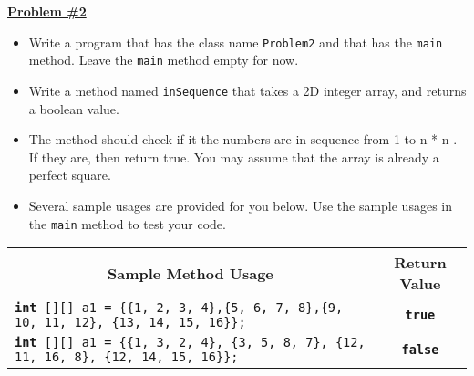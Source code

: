 \documentclass[12pt]{article}
\begin{document}
\vspace*{0.5cm}
\noindent\underline{\textbf{Problem \#2}}
\begin{itemize}
	\item Write a program that has the class name \texttt{Problem2} and that has the \texttt{main} method. Leave the \texttt{main} method empty for now.
	\item Write a method named \texttt{inSequence} that takes a 2D integer array, and returns a boolean value. 
	\item The method should check if it the numbers are in sequence from  1 to n * n . If they are, then return true. You may assume that the array is already a perfect square.
	\item Several sample usages are provided for you below. Use the sample usages in the \texttt{main} method to test your code.
\end{itemize}

\begin{table}[htbp]
  \centering
    \begin{tabular}{|p{20.66em}|c|}
    \toprule
    \multicolumn{1}{|c|}{Sample Method Usage} & Return Value \\
    \midrule
    \texttt{\textbf{int} [][] a1 = \{\{1, 2, 3,  4\},\newline \hspace*{3.30cm}\{5, 6, 7, 8\},\newline \hspace*{3.30cm}\{9, 10, 11, 12\}, \newline \hspace*{3.30cm}\{13, 14, 15, 16\}\}; }& \texttt{\textbf{true}} \\
    \midrule
    \texttt{\textbf{int} [][] a1 = \{\{1, 3, 2,  4\},\newline \hspace*{3.1cm} \{3, 5, 8, 7\},\newline \hspace*{3.1cm} \{12, 11, 16, 8\},\newline \hspace*{3.1cm} \{12, 14, 15, 16\}\};}& \texttt{\textbf{false}} \\
    \bottomrule
    \end{tabular}%
  \label{tab:addlabel}%
\end{table}%
\end{document}
